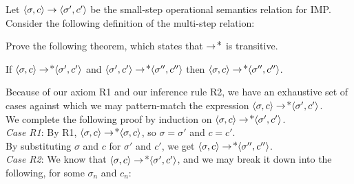 \documentclass[11pt]{article}
\begin{document}
\begin{exercise}
Let $\CONFIG{\sigma}{c} \stepsone \CONFIG{\sigma'}{c'}$ be the
small-step operational semantics relation for IMP. Consider the
following definition of the multi-step relation:

\begin{mathpar}

\end{mathpar}

\noindent Prove the following theorem, which states that
$\stepsone\kleenestar$ is transitive.

\begin{theorem*} If \( \CONFIG{\sigma}{c} \stepsone\kleenestar
\CONFIG{\sigma'}{c'} \) and \( \CONFIG{\sigma'}{c'}
\stepsone\kleenestar \CONFIG{\sigma''}{c''} \) then \(
\CONFIG{\sigma}{c} \stepsone\kleenestar \CONFIG{\sigma''}{c''} \).
\end{theorem*}

Because of our axiom R1 and our inference rule R2, we have an exhaustive set of cases against which we may pattern-match the expression \( \CONFIG{\sigma}{c} \stepsone\kleenestar
\CONFIG{\sigma'}{c'} \).\\

We complete the following proof by induction on  \( \CONFIG{\sigma}{c} \stepsone\kleenestar
\CONFIG{\sigma'}{c'} \).\\


{\it Case R1}:
By R1, \( \CONFIG{\sigma}{c} \stepsone\kleenestar \CONFIG{\sigma}{c} \), so $\sigma = \sigma'$ and $c = c'$.\\
By substituting $\sigma$ and $c$ for $\sigma'$ and $c'$, we get  \(
\CONFIG{\sigma}{c} \stepsone\kleenestar \CONFIG{\sigma''}{c''} \). \checkmark \\

{\it Case R2}: 
We know that \( \CONFIG{\sigma}{c} \stepsone\kleenestar \CONFIG{\sigma'}{c'} \), and we may break it down into the following, for some $\sigma_n$ and $c_n$:


\end{exercise}
\end{document}
